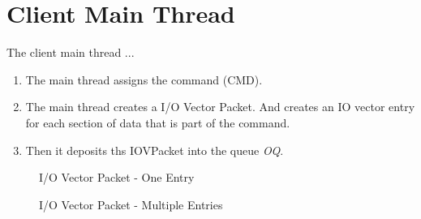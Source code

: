 \section{Client Main Thread}\label{sec:ClientMainThread}
The client main thread ...

\begin{enumerate}
\item The main thread assigns the command (CMD).
\item The main thread creates a I/O Vector Packet.
And creates an IO vector entry for each section of data that is part of the command.
\item Then it deposits ths IOVPacket into the queue \textit{OQ}.
\end{enumerate}

\begin{figure}
  \centering
  
  \caption{I/O Vector Packet - One Entry}
  \label{fig:IovPacket}
\end{figure}

\begin{figure}
  \centering
  
  \caption{I/O Vector Packet - Multiple Entries}
  \label{fig:IovPacket2}
\end{figure}

